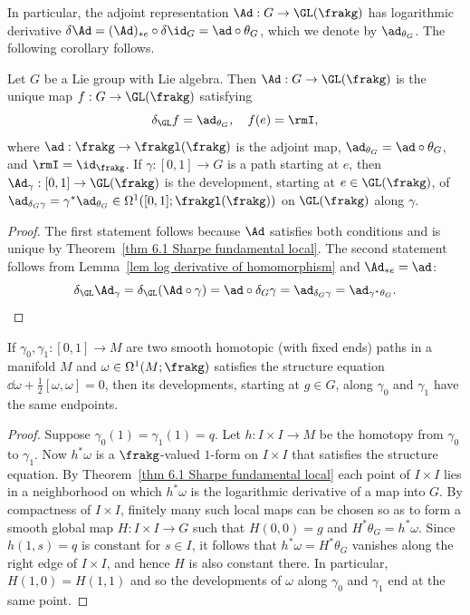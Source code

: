 In particular, the adjoint representation $\Ad:G\to \GL(\frakg)$ has logarithmic derivative $\delta \Ad=(\Ad)_{\ast e}\circ \delta\id_G=\ad\circ\theta_G$, which we denote by $\ad_{\theta_G}$. The following corollary follows.

\begin{cor}\label{cor 5.3 Sharpe}
    Let $G$ be a Lie group with Lie algebra. Then $\Ad:G\to \GL(\frakg)$ is the unique map $f:G\to \GL(\frakg)$ satisfying
    \[\delta_{\GL} f=\ad_{\theta_G},\quad f(e)=\rmI,\]
    where $\ad:\frakg\to \frakgl(\frakg)$ is the adjoint map, $\ad_{\theta_G}=\ad\circ\theta_G$, and $\rmI=\id_\frakg$. 
    If $\gamma:[0,1]\to G$ is a path starting at $e$, then $\Ad_\gamma:[0,1]\to \GL(\frakg)$ is the development, starting at $e\in\GL(\frakg)$, of $\ad_{\delta_G \gamma}=\gamma^\ast \ad_{\theta_G}\in\Omega^1([0,1];\frakgl(\frakg))$ on $\GL(\frakg)$ along $\gamma$.
\end{cor}
\begin{proof}
    The first statement follows because $\Ad$ satisfies both conditions and is unique by Theorem~\ref{thm 6.1 Sharpe fundamental local}. 
    The second statement follows from Lemma~\ref{lem log derivative of homomorphism} and $\Ad_{\ast e}=\ad$:
    \[\delta_{\GL}\Ad_\gamma=\delta_{\GL}(\Ad\circ \gamma)=\ad\circ \delta_G \gamma=\ad_{\delta_G \gamma}=\ad_{\gamma^\ast\theta_G}.\]
\end{proof}

\begin{thm}\label{thm 7.7 Sharpe}
    If $\gamma_0,\gamma_1:[0,1]\to M$ are two smooth homotopic (with fixed ends) paths in a manifold $M$ and $\omega\in \Omega^1(M;\frakg)$ satisfies the structure equation $\dd \omega+\frac 12[\omega,\omega]=0$, then its developments, starting at $g\in G$, along $\gamma_0$ and $\gamma_1$ have the same endpoints.
\end{thm}
\begin{proof}
    Suppose $\gamma_0(1)=\gamma_1(1)=q$. Let $h:I\times I\to M$ be the homotopy from $\gamma_0$ to $\gamma_1$. Now $h^\ast\omega$ is a $\frakg$-valued $1$-form on $I\times I$ that satisfies the structure equation.  By Theorem~\ref{thm 6.1 Sharpe fundamental local} each point of $I\times I$ lies in a neighborhood on which $h^\ast\omega$ is the logarithmic derivative of a map into $G$. By compactness of $I\times I$, finitely many such local maps can be chosen so as to form a smooth global map $H:I\times I\to G$ such that $H(0,0)=g$ and $H^\ast\theta_G=h^\ast\omega$. Since $h(1,s)=q$ is constant for $s\in I$, it follows that $h^\ast\omega=H^\ast\theta_G$ vanishes along the right edge of $I\times I$, and hence $H$ is also constant there. In particular, $H(1,0)=H(1,1)$ and so the developments of $\omega$ along $\gamma_0$ and $\gamma_1$ end at the same point.
\end{proof}

